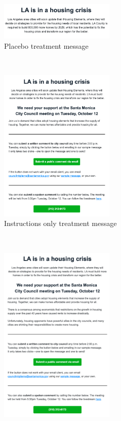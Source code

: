 \documentclass[12pt,final,fleqn]{article}
\theoremstyle{plain}
\begin{document}
\vspace{-0.75cm}
\begin{figure}[H]
    \centering
        \begin{subfigure}[t]{0.45\textwidth}
        \centering
        \includegraphics[width=5.5cm]{../figs/fgA2.1.png}
        \caption{Placebo treatment message} \label{subfig: placebo}
    \end{subfigure}
    ~
    \begin{subfigure}[t]{0.45\textwidth}
        \centering
        \includegraphics[width=5.5cm]{../figs/fgA2.2.png}
        \caption{Instructions only treatment message} \label{subfig: T1}
        \vspace{0.5cm}
    \end{subfigure}
    ~ 
    \begin{subfigure}[b]{0.45\textwidth}
        \centering
        \includegraphics[width=5.5cm]{../figs/fgA2.3.png}

\end{subfigure}
\end{figure}
\end{document}
